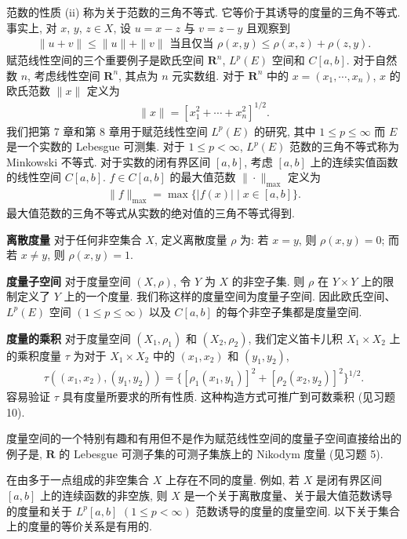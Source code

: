 \documentclass[../../main.tex]{subfiles}
\begin{document}
范数的性质 (ii) 称为关于范数的三角不等式. 它等价于其诱导的度量的三角不等式. 事实上, 对 $x$, $y$, $z\in X$, 设 $u=x-z$ 与 $v=z-y$ 且观察到
\begin{align*}
\|u+v\|\leqslant\|u\|+\|v\|\text{ 当且仅当 }\rho(x,y)\leqslant\rho(x,z)+\rho(z,y).
\end{align*}
赋范线性空间的三个重要例子是欧氏空间 $\mathbf{R}^{n}$, $L^{p}(E)$ 空间和 $C[a,b]$. 对于自然数 $n$, 考虑线性空间 $\mathbf{R}^{n}$, 其点为 $n$ 元实数组. 对于 $\mathbf{R}^{n}$ 中的 $x=(x_{1},\cdots,x_{n})$, $x$ 的欧氏范数 $\|x\|$ 定义为
\begin{align*}
\|x\|=[x_{1}^{2}+\cdots+x_{n}^{2}]^{1/2}.
\end{align*}
我们把第 7 章和第 8 章用于赋范线性空间 $L^{p}(E)$ 的研究, 其中 $1\leqslant p\leqslant\infty$ 而 $E$ 是一个实数的 Lebesgue 可测集. 对于 $1\leqslant p<\infty$, $L^{p}(E)$ 范数的三角不等式称为 Minkowski 不等式. 对于实数的闭有界区间 $[a,b]$, 考虑 $[a,b]$ 上的连续实值函数的线性空间 $C[a,b]$. $f\in C[a,b]$ 的最大值范数 $\|\cdot\|_{\max}$ 定义为
\begin{align*}
\|f\|_{\max}=\max\{|f(x)|\mid x\in[a,b]\}.
\end{align*}
最大值范数的三角不等式从实数的绝对值的三角不等式得到.

\textbf{离散度量} 对于任何非空集合 $X$, 定义离散度量 $\rho$ 为: 若 $x=y$, 则 $\rho(x,y)=0$; 而若 $x\neq y$, 则 $\rho(x,y)=1$.

\textbf{度量子空间} 对于度量空间 $(X,\rho)$, 令 $Y$ 为 $X$ 的非空子集. 则 $\rho$ 在 $Y\times Y$ 上的限制定义了 $Y$ 上的一个度量. 我们称这样的度量空间为度量子空间. 因此欧氏空间、 $L^{p}(E)$ 空间 $(1\leqslant p\leqslant\infty)$ 以及 $C[a,b]$ 的每个非空子集都是度量空间.

\textbf{度量的乘积} 对于度量空间 $(X_{1},\rho_{1})$ 和 $(X_{2},\rho_{2})$, 我们定义笛卡儿积 $X_{1}\times X_{2}$ 上的乘积度量 $\tau$ 为对于 $X_{1}\times X_{2}$ 中的 $(x_{1},x_{2})$ 和 $(y_{1},y_{2})$,
\begin{align*}
\tau((x_{1},x_{2}),(y_{1},y_{2}))=\{[\rho_{1}(x_{1},y_{1})]^{2}+[\rho_{2}(x_{2},y_{2})]^{2}\}^{1/2}.
\end{align*}
容易验证 $\tau$ 具有度量所要求的所有性质. 这种构造方式可推广到可数乘积 (见习题 10).

度量空间的一个特别有趣和有用但不是作为赋范线性空间的度量子空间直接给出的例子是, $\mathbf{R}$ 的 Lebesgue 可测子集的可测子集族上的 Nikodym 度量 (见习题 5).

在由多于一点组成的非空集合 $X$ 上存在不同的度量. 例如, 若 $X$ 是闭有界区间 $[a,b]$ 上的连续函数的非空族, 则 $X$ 是一个关于离散度量、关于最大值范数诱导的度量和关于 $L^{p}[a,b]$ $(1\leqslant p<\infty)$ 范数诱导的度量的度量空间. 以下关于集合上的度量的等价关系是有用的.
\end{document}
